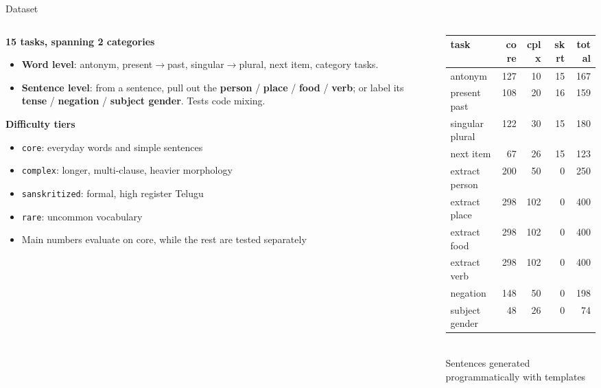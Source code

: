 \documentclass[aspectratio=169,11pt]{beamer}
\newcommand{\src}[1]{{\scriptsize\color{black!55} #1}}
\newcommand{\tight}{\setlength{\itemsep}{2pt plus 1pt minus 1pt}}
\begin{document}
\begin{frame}{Dataset}
  \begin{columns}[T]
    \begin{column}{0.54\textwidth}
      \textbf{15 tasks, spanning 2 categories}
      \begin{itemize}\footnotesize\tight
        \item \textbf{Word level}: antonym, present$\to$past,
              singular$\to$plural, next item, category tasks.
        \item \textbf{Sentence level}: from a sentence, pull out the
              \textbf{person} / \textbf{place} / \textbf{food} / \textbf{verb};
              or label its \textbf{tense} / \textbf{negation} /
              \textbf{subject gender}. Tests code mixing.
      \end{itemize}
      \vspace{1.5mm}
      \textbf{Difficulty tiers}
      \begin{itemize}\footnotesize\tight
        \item \texttt{core}: everyday words and simple sentences
        \item \texttt{complex}: longer, multi-clause, heavier morphology
        \item \texttt{sanskritized}: formal, high register Telugu
        \item \texttt{rare}: uncommon vocabulary
        \item Main numbers evaluate on core, while the rest are tested separately
      \end{itemize}
    \end{column}
    \begin{column}{0.46\textwidth}
      \centering
      {\scriptsize\setlength{\tabcolsep}{3.0pt}
      \begin{tabular}{lrrrr}
        \toprule
        task & core & cplx & skrt & total \\
        \midrule
        antonym          & 127 & 10 & 15 & 167 \\
        present past     & 108 & 20 & 16 & 159 \\
        singular plural  & 122 & 30 & 15 & 180 \\
        next item        &  67 & 26 & 15 & 123 \\
        extract person   & 200 & 50 & 0 & 250 \\
        extract place    & 298 & 102 & 0 & 400 \\
        extract food     & 298 & 102 & 0 & 400 \\
        extract verb     & 298 & 102 & 0 & 400 \\
        negation         & 148 & 50 & 0 & 198 \\
        subject gender   &  48 & 26 & 0 &  74 \\
        \bottomrule
      \end{tabular}}
      \\[2mm]
      \src{Sentences generated programmatically with templates}
    \end{column}
  \end{columns}
\end{frame}
\end{document}
